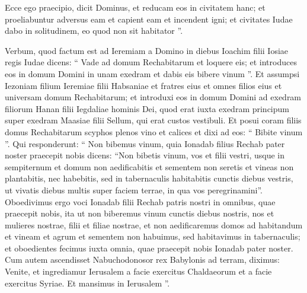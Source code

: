 \begin{biblechapter}
\begin{biblechapter}
\begin{biblechapter}
\begin{biblechapter}
\begin{biblechapter}
\begin{biblechapter}
\begin{biblechapter}
\begin{biblechapter}
\begin{biblechapter}
\begin{biblechapter}
\begin{biblechapter}
\begin{biblechapter}
\begin{biblechapter}
\begin{biblechapter}
\begin{biblechapter}
\begin{biblechapter}
\begin{biblechapter}
\begin{biblechapter}
\begin{biblechapter}
\begin{biblechapter}
\begin{biblechapter}
\begin{biblechapter}
\begin{biblechapter}
\begin{biblechapter}
\begin{biblechapter}
\begin{biblechapter}
\begin{biblechapter}
\begin{biblechapter}
\begin{biblechapter}
\begin{biblechapter}
\begin{biblechapter}
\begin{biblechapter}
\begin{biblechapter}
\begin{biblechapter}
\verse Ecce ego praecipio, dicit Dominus, et reducam eos in civitatem hanc; et proeliabuntur adversus eam et capient eam et incendent igni; et civitates Iudae dabo in solitudinem, eo quod non sit habitator ”.
 
\begin{biblechapter}
\verse Verbum, quod factum est ad Ieremiam a Domino in diebus Ioachim filii Iosiae regis Iudae dicens: 
\verse “ Vade ad domum Rechabitarum et loquere eis; et introduces eos in domum Domini in unam exedram et dabis eis bibere vinum ”. 
 \verse Et assumpsi Iezoniam filium Ieremiae filii Habsaniae et fratres eius et omnes filios eius et universam domum Rechabitarum; 
\verse et introduxi eos in domum Domini ad exedram filiorum Hanan filii Iegdaliae hominis Dei, quod erat iuxta exedram principum super exedram Maasiae filii Sellum, qui erat custos vestibuli. 
 \verse Et posui coram filiis domus Rechabitarum scyphos plenos vino et calices et dixi ad eos: “ Bibite vinum ”.
 \verse Qui responderunt: “ Non bibemus vinum, quia Ionadab filius Rechab pater noster praecepit nobis dicens: “Non bibetis vinum, vos et filii vestri, usque in sempiternum 
\verse et domum non aedificabitis et sementem non seretis et vineas non plantabitis, nec habebitis, sed in tabernaculis habitabitis cunctis diebus vestris, ut vivatis diebus multis super faciem terrae, in qua vos peregrinamini”. 
\verse Oboedivimus ergo voci Ionadab filii Rechab patris nostri in omnibus, quae praecepit nobis, ita ut non biberemus vinum cunctis diebus nostris, nos et mulieres nostrae, filii et filiae nostrae, 
\verse et non aedificaremus domos ad habitandum et vineam et agrum et sementem non habuimus, 
\verse sed habitavimus in tabernaculis; et oboedientes fecimus iuxta omnia, quae praecepit nobis Ionadab pater noster. 
\verse Cum autem ascendisset Nabuchodonosor rex Babylonis ad terram, diximus: Venite, et ingrediamur Ierusalem a facie exercitus Chaldaeorum et a facie exercitus Syriae. Et mansimus in Ierusalem ”.

\end{biblechapter}
\end{biblechapter}
\end{biblechapter}
\end{biblechapter}
\end{biblechapter}
\end{biblechapter}
\end{biblechapter}
\end{biblechapter}
\end{biblechapter}
\end{biblechapter}
\end{biblechapter}
\end{biblechapter}
\end{biblechapter}
\end{biblechapter}
\end{biblechapter}
\end{biblechapter}
\end{biblechapter}
\end{biblechapter}
\end{biblechapter}
\end{biblechapter}
\end{biblechapter}
\end{biblechapter}
\end{biblechapter}
\end{biblechapter}
\end{biblechapter}
\end{biblechapter}
\end{biblechapter}
\end{biblechapter}
\end{biblechapter}
\end{biblechapter}
\end{biblechapter}
\end{biblechapter}
\end{biblechapter}
\end{biblechapter}
\end{biblechapter}
